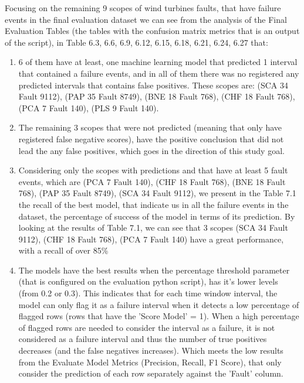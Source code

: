 Focusing on the remaining 9 scopes of wind turbines faults, that have failure events in the final evaluation dataset we can see from the analysis of the Final Evaluation Tables (the tables with the confusion matrix metrics that is an output of the script), in Table 6.3, 6.6, 6.9, 6.12, 6.15, 6.18, 6.21, 6.24, 6.27 that:
\begin{enumerate}
    \item
6 of them have at least, one machine learning model that predicted 1 interval that contained a failure events, and in all of them there was no registered any predicted intervals that contains false positives.
These scopes are: (SCA 34 Fault 9112), (PAP 35 Fault 8749), (BNE 18 Fault 768), (CHF 18 Fault 768), (PCA 7 Fault 140), (PLS 9 Fault 140).
    \item
The remaining 3 scopes that were not predicted (meaning that only have registered false negative scores), have the positive conclusion that did not lead the any false positives, which goes in the direction of this study goal.
    \item
Considering only the scopes with predictions and that have at least 5 fault events, which are (PCA 7 Fault 140), (CHF 18 Fault 768), (BNE 18 Fault 768), (PAP 35 Fault 8749), (SCA 34 Fault 9112), we present in the Table 7.1 the recall of the best model, that indicate us in all the failure events in the dataset, the percentage of success of the model in terms of its prediction.
By looking at the results of Table 7.1, we can see that 3 scopes (SCA 34 Fault 9112), (CHF 18 Fault 768), (PCA 7 Fault 140) have a great performance, with a recall of over 85\%
    \item
The models have the best results when the percentage threshold parameter (that is configured on the evaluation python script), has it's lower levels (from 0.2 or 0.3). This indicates that for each time window interval, the model can only flag it as a failure interval when it detects a low percentage of flagged rows (rows that have the 'Score Model' = 1). When a high percentage of flagged rows are needed to consider the interval as a failure, it is not considered as a failure interval and thus the number of true positives decreases (and the false negatives increases). 
Which meets the low results from the Evaluate Model Metrics (Precision, Recall, F1 Score), that only consider the prediction of each row separately against the 'Fault' column.
\end{enumerate}

